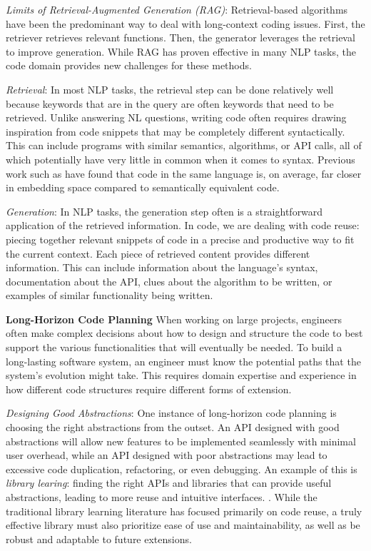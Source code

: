 \textit{Limits of Retrieval-Augmented Generation (RAG)}: Retrieval-based algorithms have been the predominant way to deal with long-context coding issues. First, the retriever retrieves relevant functions. Then, the generator leverages the retrieval to improve generation. While RAG has proven effective in many NLP tasks, the code domain provides new challenges for these methods.

\textit{Retrieval}: In most NLP tasks, the retrieval step can be done relatively well because keywords that are in the query are often keywords that need to be retrieved. Unlike answering NL questions, writing code often requires drawing inspiration from code snippets that may be completely different syntactically. This can include programs with similar semantics, algorithms, or API calls, all of which potentially have very little in common when it comes to syntax. Previous work such as \citet{ma2024unveiling, utpala2023language} have found that code in the same language is, on average, far closer in embedding space compared to semantically equivalent code.

\textit{Generation}: In NLP tasks, the generation step often is a straightforward application of the retrieved information. In code, we are dealing with code reuse: piecing together relevant snippets of code in a precise and productive way to fit the current context. Each piece of retrieved content provides different information. This can include information about the language's syntax, documentation about the API, clues about the algorithm to be written, or examples of similar functionality being written. 

\textbf{Long-Horizon Code Planning}
When working on large projects, engineers often make complex decisions about how to design and structure the code to best support the various functionalities that will eventually be needed. To build a long-lasting software system, an engineer must know the potential paths that the system's evolution might take. This requires domain expertise and experience in how different code structures require different forms of extension. 

\textit{Designing Good Abstractions}:
One instance of long-horizon code planning is choosing the right abstractions from the outset. An API designed with good abstractions will allow new features to be implemented seamlessly with minimal user overhead, while an API designed with poor abstractions may lead to excessive code duplication, refactoring, or even debugging. An example of this is \textit{library learing}: finding the right APIs and libraries that can provide useful abstractions, leading to more reuse and intuitive interfaces. \citep{ellis2021dreamcoder,10.5555/3692070.3693967,10.1145/3571234}. While the traditional library learning literature has focused primarily on code reuse, a truly effective library must also prioritize ease of use and maintainability, as well as be robust and adaptable to future extensions.

